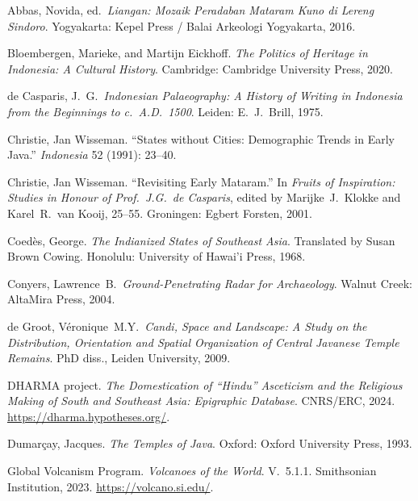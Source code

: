 \documentclass[12pt,a4paper]{article}
\begin{document}
\noindent Abbas, Novida, ed.\ \emph{Liangan: Mozaik Peradaban Mataram Kuno di Lereng Sindoro}. Yogyakarta: Kepel Press / Balai Arkeologi Yogyakarta, 2016.

\vspace{0.5em}
\noindent Bloembergen, Marieke, and Martijn Eickhoff. \emph{The Politics of Heritage in Indonesia: A Cultural History}. Cambridge: Cambridge University Press, 2020.

\vspace{0.5em}
\noindent de Casparis, J.~G.\ \emph{Indonesian Palaeography: A History of Writing in Indonesia from the Beginnings to c.~A.D.~1500}. Leiden: E.~J.\ Brill, 1975.

\vspace{0.5em}
\noindent Christie, Jan Wisseman. ``States without Cities: Demographic Trends in Early Java.'' \emph{Indonesia} 52 (1991): 23--40.

\vspace{0.5em}
\noindent Christie, Jan Wisseman. ``Revisiting Early Mataram.'' In \emph{Fruits of Inspiration: Studies in Honour of Prof.~J.G.\ de Casparis}, edited by Marijke~J.\ Klokke and Karel~R.\ van Kooij, 25--55. Groningen: Egbert Forsten, 2001.

\vspace{0.5em}
\noindent Coed\`{e}s, George. \emph{The Indianized States of Southeast Asia}. Translated by Susan Brown Cowing. Honolulu: University of Hawai'i Press, 1968.

\vspace{0.5em}
\noindent Conyers, Lawrence~B.\ \emph{Ground-Penetrating Radar for Archaeology}. Walnut Creek: AltaMira Press, 2004.

\vspace{0.5em}
\noindent de Groot, V\'{e}ronique~M.Y.\ \emph{Candi, Space and Landscape: A Study on the Distribution, Orientation and Spatial Organization of Central Javanese Temple Remains}. PhD diss., Leiden University, 2009.

\vspace{0.5em}
\noindent DHARMA project. \emph{The Domestication of ``Hindu'' Asceticism and the Religious Making of South and Southeast Asia: Epigraphic Database}. CNRS/ERC, 2024. \url{https://dharma.hypotheses.org/}.

\vspace{0.5em}
\noindent Dumar\c{c}ay, Jacques. \emph{The Temples of Java}. Oxford: Oxford University Press, 1993.

\vspace{0.5em}
\noindent Global Volcanism Program. \emph{Volcanoes of the World}. V.~5.1.1. Smithsonian Institution, 2023. \url{https://volcano.si.edu/}.
\end{document}

